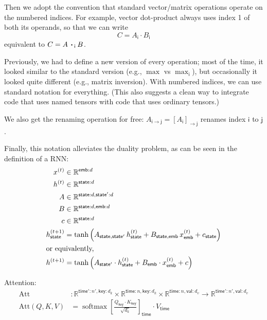 \documentclass{article}
\newcommand{\name}[1]{\mathsf{#1}}
\newcommand{\ndot}[1]{\mathbin{\mathop{\thinspace\boldsymbol\cdot\thinspace}\displaylimits_{\name{#1}}}}
\DeclareMathOperator*{\softmax}{softmax}
\begin{document}
Then we adopt the convention that standard vector/matrix operations operate on the numbered indices. For example, vector dot-product always uses index 1 of both its operands, so that we can write
\begin{equation*}
C = A_{\name{i}} \cdot B_{\name{i}}
\end{equation*}
equivalent to $C = A \ndot{i} B$. 

Previously, we had to define a new version of every operation; most of the time, it looked similar to the standard version (e.g., $\max$ vs $\max_{\name{i}}$), but occasionally it looked quite different (e.g., matrix inversion). With numbered indices, we can use standard notation for everything.
(This also suggests a clean way to integrate code that uses named tensors with code that uses ordinary tensors.)

We also get the renaming operation for free: $A_{\name{i}\rightarrow\name{j}} = [A_{\name{i}}]_{\rightarrow\name{j}}$ renames index $\name{i}$ to $\name{j}$.

Finally, this notation alleviates the duality problem, as can be seen in the definition of a RNN:
\begin{align*}
x^{(t)} &\in \mathbb{R}^{\name{emb}: d} \\
h^{(t)} &\in \mathbb{R}^{\name{state}: d} \\
A &\in \mathbb{R}^{\name{state}: d, \name{state'}: d} \\
B &\in \mathbb{R}^{\name{state}: d, \name{emb}: d} \\
c &\in \mathbb{R}^{\name{state}: d} \\
h^{(t+1)}_{\name{state}} &= \tanh\left( A_{\name{state},\name{state'}} \, h^{(t)}_{\name{state}} + B_{\name{state},\name{emb}} \, x^{(t)}_{\name{emb}} + c_{\name{state}} \right) \\
\intertext{or equivalently,}
h^{(t+1)} &= \tanh\left( A_{\name{state'}} \cdot h^{(t)}_{\name{state}} + B_{\name{emb}} \cdot x^{(t)}_{\name{emb}} + c \right) \\
\end{align*}

Attention:
\begin{align*}
  \text{Att} &\colon \mathbb{R}^{\name{time'}:n',\name{key}:d_k} \times \mathbb{R}^{\name{time}:n,\name{key}:d_k} \times \mathbb{R}^{\name{time}:n,\name{val}:d_v} \rightarrow \mathbb{R}^{\name{time'}:n',\name{val}:d_v} \\
  \text{Att}(Q,K,V) &= \softmax \left[ \frac{Q_{\name{key}} \cdot K_\name{key}}{\sqrt{d_k}} \right]_{\name{time}} \cdot V_{\name{time}}
\end{align*}
\end{document}
